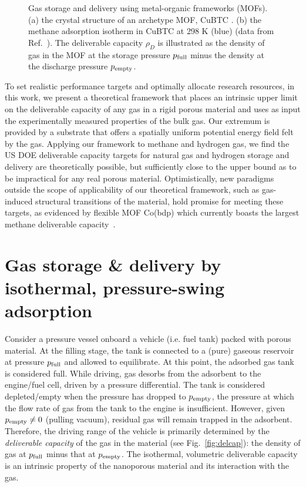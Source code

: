 \begin{figure}
    \centering
    \qquad
    \caption{Gas storage and delivery using metal-organic frameworks (MOFs). (a) the crystal structure of an archetype MOF, CuBTC \cite{chui1999chemically}. (b) the methane adsorption isotherm in CuBTC \cite{chui1999chemically} at 298 K (blue) (data from Ref.~\cite{mason2014evaluating}). The deliverable capacity $\rho_D$ is illustrated as the density of gas in the MOF at the storage pressure $p_{\text{full}}$ minus the density at the discharge pressure $p_{\text{empty}}$.
    }
    \label{fig:fig1}
\end{figure}

To set realistic performance targets and optimally allocate research resources,
in this work, we present a theoretical framework that places an intrinsic upper
limit on the deliverable capacity of any gas in a rigid porous material and
uses as input the experimentally measured properties of the bulk gas. Our
extremum is provided by a substrate that offers a spatially uniform potential
energy field felt by the gas. Applying our framework to methane and hydrogen
gas, we find the US DOE deliverable capacity targets for natural gas and
hydrogen storage and delivery are theoretically possible, but sufficiently
close to the upper bound as to be impractical for any real porous material.
Optimistically, new paradigms outside the scope of applicability of our
theoretical framework, such as gas-induced structural transitions of the
material, hold promise for meeting these targets, as evidenced by flexible MOF
Co(bdp) which currently boasts the largest methane deliverable
capacity~\cite{mason2015methane}.

\section{Gas storage \& delivery by isothermal, pressure-swing adsorption}
Consider a pressure vessel onboard a vehicle (i.e. fuel tank) packed with
porous material. At the filling stage, the tank is connected to a (pure)
gaseous reservoir at pressure $p_{\text{full}}$ and allowed to equilibrate. At this
point, the adsorbed gas tank is considered full. While driving, gas desorbs
from the adsorbent to the engine/fuel cell, driven by a pressure differential.
The tank is considered depleted/empty when the pressure has dropped to
$p_{\text{empty}}$, the pressure at which the flow rate of gas from the tank to the
engine is insufficient. However, given $p_{\text{empty}} \neq 0$ (pulling vacuum),
residual gas will remain trapped in the adsorbent. Therefore, the driving range
of the vehicle is primarily determined by the \emph{deliverable capacity} of
the gas in the material (see Fig.~\ref{fig:delcap}): the density of gas at
$p_{\text{full}}$ minus that at $p_{\text{empty}}$. The isothermal, volumetric deliverable
capacity is an intrinsic property of the nanoporous material and its
interaction with the gas.

